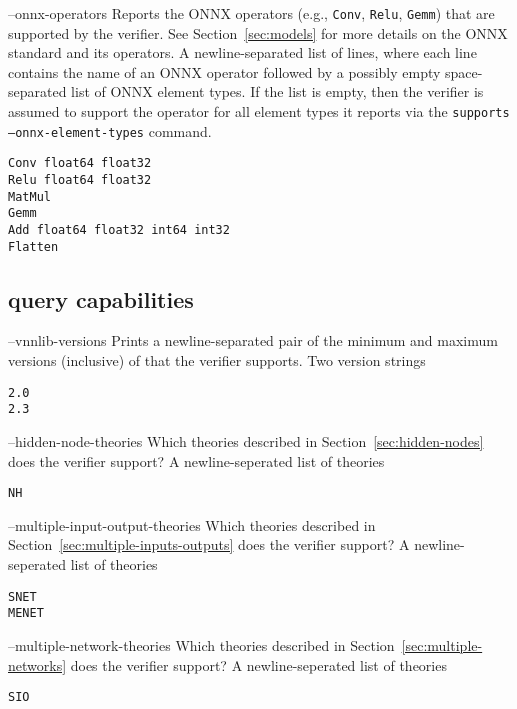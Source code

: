\clOutputOption
{--onnx-operators}
{Reports the ONNX operators (e.g., \texttt{Conv}, \texttt{Relu}, \texttt{Gemm}) that are supported by the verifier. See Section~\ref{sec:models} for more details on the ONNX standard and its operators. 
}
{A newline-separated list of lines, where each line contains the name of an ONNX operator followed by a possibly empty space-separated list of ONNX element types. If the list is empty, then the verifier is assumed to support the operator for all element types it reports via the \texttt{supports --onnx-element-types} command.
}
\begin{lstlisting}[style=bash]
%*\exampleVerifier* supports --onnx-operators
Conv float64 float32
Relu float64 float32
MatMul
Gemm
Add float64 float32 int64 int32
Flatten
\end{lstlisting}

\subsection{\vnnlib{} query capabilities}

\clOutputOption
{--vnnlib-versions}
{Prints a newline-separated pair of the minimum and maximum versions (inclusive) of \vnnlib{} that the verifier supports.}
{Two version strings}
\begin{lstlisting}[style=bash]
%*\exampleVerifier* supports --vnnlib-versions
2.0
2.3
\end{lstlisting}

\clOutputOption
{--hidden-node-theories}
{Which \hiddenNodes{} theories described in Section~\ref{sec:hidden-nodes} does the verifier support?}
{A newline-seperated list of theories}
\begin{lstlisting}[style=bash]
%*\exampleVerifier* supports --hidden-node-theories
NH
\end{lstlisting}

\clOutputOption
{--multiple-input-output-theories}
{Which \multiIO{} theories described in Section~\ref{sec:multiple-inputs-outputs} does the verifier support?}
{A newline-seperated list of theories}
\begin{lstlisting}[style=bash]
%*\exampleVerifier* supports --multiple-inputs-output-theories
SNET
MENET
\end{lstlisting}

\clOutputOption
{--multiple-network-theories}
{Which \multiNetwork{} theories described in Section~\ref{sec:multiple-networks} does the verifier support?}
{A newline-seperated list of theories}
\begin{lstlisting}[style=bash]
%*\exampleVerifier* supports --multiple-network-theories
SIO
\end{lstlisting}

